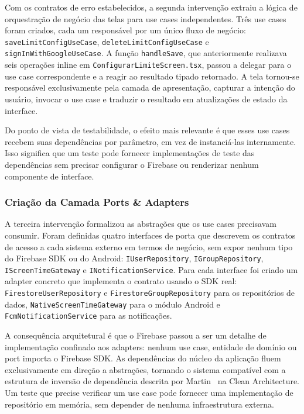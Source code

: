 \documentclass[sigconf,anonymous]{acmart}
\begin{document}
Com os contratos de erro estabelecidos, a segunda intervenção extraiu a lógica de orquestração de negócio das telas para use cases independentes. Três use cases foram criados, cada um responsável por um único fluxo de negócio: \texttt{saveLimitConfigUseCase}, \texttt{deleteLimitConfigUseCase} e \texttt{signInWithGoogleUseCase}. A função \texttt{handleSave}, que anteriormente realizava seis operações inline em \texttt{ConfigurarLimiteScreen.tsx}, passou a delegar para o use case correspondente e a reagir ao resultado tipado retornado. A tela tornou-se responsável exclusivamente pela camada de apresentação, capturar a intenção do usuário, invocar o use case e traduzir o resultado em atualizações de estado da interface.

Do ponto de vista de testabilidade, o efeito mais relevante é que esses use cases recebem suas dependências por parâmetro, em vez de instanciá-las internamente. Isso significa que um teste pode fornecer implementações de teste das dependências sem precisar configurar o Firebase ou renderizar nenhum componente de interface.

\subsubsection{Criação da Camada Ports \& Adapters}

A terceira intervenção formalizou as abstrações que os use cases precisavam consumir. Foram definidas quatro interfaces de porta que descrevem os contratos de acesso a cada sistema externo em termos de negócio, sem expor nenhum tipo do Firebase SDK ou do Android: \texttt{IUserRepository}, \texttt{IGroupRepository}, \texttt{IScreenTimeGateway} e \texttt{INotificationService}. Para cada interface foi criado um adapter concreto que implementa o contrato usando o SDK real: \texttt{FirestoreUserRepository} e \texttt{FirestoreGroupRepository} para os repositórios de dados, \texttt{NativeScreenTimeGateway} para o módulo Android e \texttt{FcmNotificationService} para as notificações.

A consequência arquitetural é que o Firebase passou a ser um detalhe de implementação confinado aos adapters: nenhum use case, entidade de domínio ou port importa o Firebase SDK. As dependências do núcleo da aplicação fluem exclusivamente em direção a abstrações, tornando o sistema compatível com a estrutura de inversão de dependência descrita por Martin~\cite{Martin2017} na Clean Architecture. Um teste que precise verificar um use case pode fornecer uma implementação de repositório em memória, sem depender de nenhuma infraestrutura externa.
\end{document}
